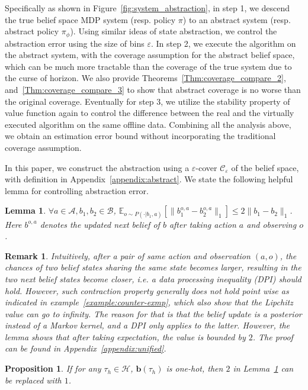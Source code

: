 \documentclass[twoside]{article}
\newtheorem{lemma}{Lemma}
\newtheorem{proposition}{Proposition}
\newtheorem{remark}{Remark}
\newcommand{\CAL}[1]{\mathcal{#1}}
\newcommand{\zyh}[1]{{\color{blue}{ [\textbf{Youheng:}} #1]}}
\newcommand{\yplu}[1]{{\color{orange}{ [\textbf{Yiping:}} #1]}}
\begin{document}
Specifically as shown in Figure~\ref{fig:system_abstraction}, in step 1, we descend the true belief space MDP system (resp. policy $\pi$) to an abstract system (resp. abstract policy $\pi_{\phi}$). Using similar ideas of state abstraction, we control the abstraction error using the size of bins $\varepsilon$. %
In step 2, we execute the algorithm on the abstract system, with the coverage assumption for the abstract belief space, which can be much more tractable than the coverage of the true system due to the curse of horizon. We also provide Theorems~\ref{Thm:coverage_compare_2}, and~\ref{Thm:coverage_compare_3} to show that abstract coverage is no worse than the original coverage. %
Eventually for step 3, we utilize the stability property of value function again to control the difference between the real and the virtually executed algorithm on the same offline data. Combining all the analysis above, we obtain an estimation error bound without incorporating the traditional coverage assumption.

In this paper, we construct the abstraction using a $\varepsilon$-cover $\mathcal{C}_{\varepsilon}$ of the belief space, with definition in Appendix~\ref{appendix:abstract}. We state the following helpful lemma for controlling abstraction error.
\begin{lemma}\label{lemma:update_belief_lipchitz}
    $\forall a\in\CAL{A}, b_1,b_2\in\CAL{B}$, $\mathbb{E}_{o\sim P(\cdot|b_1,a)}[\|b_1^{o,a}-b_2^{o,a}\|_1]\leq 2 \|b_1-b_2\|_1$. Here $b^{o,a}$ denotes the updated next belief of $b$ after taking action $a$ and observing $o$.
\end{lemma}\begin{remark}
    Intuitively, after a pair of same action and observation $(a,o)$, the chances of two belief states sharing the same state becomes larger, resulting in the two next belief states become closer, i.e. a data processing inequality (DPI) should hold. However, such contraction property generally does not hold point wise as indicated in example~\ref{example:counter-exmp}, which also show that the Lipchitz value can go to infinity. The reason for that is that the belief update is a posterior instead of a Markov kernel, and a DPI only applies to the latter. However, the lemma shows that after taking expectation, the value is bounded by $2$. The proof can be found in Appendix~\ref{appendix:unified}.%
\end{remark}
\begin{proposition}\label{prop:one_hot_L_b}
    If for any $\tau_h\in\CAL{H}$, $\mathbf{b}(\tau_h)$ is one-hot, then $2$ in Lemma~\ref{lemma:update_belief_lipchitz} can be replaced with $1$.
\end{proposition}
\end{document}
